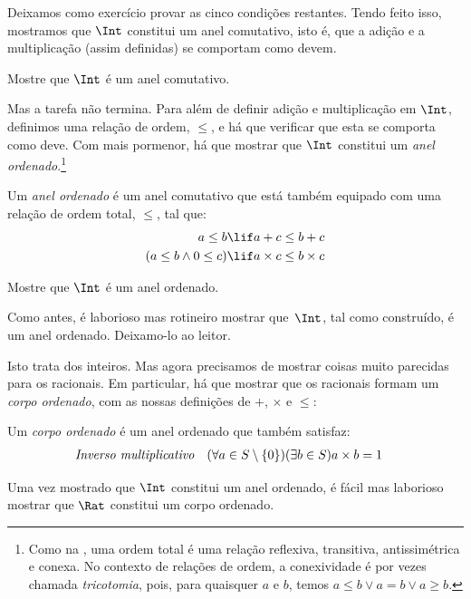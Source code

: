 \documentclass[../../../include/open-logic-section]{subfiles}
\begin{document}
Deixamos como exercício provar as cinco condições restantes. Tendo feito isso,
mostramos que $\Int$ constitui um anel comutativo, isto é, que a adição e a
multiplicação (assim definidas) se comportam como devem.

\begin{prob}
Mostre que $\Int$ é um anel comutativo.
\end{prob}

Mas a tarefa não termina. Para além de definir adição e multiplicação em $\Int$,
definimos uma relação de ordem, $\leq$, e há que verificar que esta se comporta
como deve. Com mais pormenor, há que mostrar que $\Int$ constitui um \emph{anel
ordenado}.\footnote{Como na , uma
	ordem total é uma relação reflexiva, transitiva, antissimétrica e conexa.
	No contexto de relações de ordem, a conexividade é por vezes chamada
	\emph{tricotomia}, pois, para quaisquer $a$ e $b$, temos $a \leq b \lor a
	= b \lor a \geq b$.} 

\begin{defn}
Um \emph{anel ordenado} é um anel comutativo que está também equipado com uma
relação de ordem total, $\leq$, tal que:
\begin{align*}
	a \leq b &\lif a + c \leq b + c\\
	(a \leq b \land 0 \leq c) &\lif a \times c \leq b \times c
\end{align*}
\end{defn}

\begin{prob}
Mostre que $\Int$ é um anel ordenado. 
\end{prob}

Como antes, é laborioso mas rotineiro mostrar que~$\Int$, tal como construído, é
um anel ordenado. Deixamo-lo ao leitor.

Isto trata dos inteiros. Mas agora precisamos de mostrar coisas muito parecidas
para os racionais. Em particular, há que mostrar que os racionais formam um
\emph{corpo ordenado}, com as nossas definições de $+$, $\times$ e $\leq$:
\begin{defn}
Um \emph{corpo ordenado} é um anel ordenado que também satisfaz:
\begin{align*}
	\emph{Inverso multiplicativo}& & (\forall a \in S \setminus \{0\})(\exists b \in S) a\times b& = 1
\end{align*}
\end{defn}

Uma vez mostrado que $\Int$ constitui um anel ordenado, é fácil mas laborioso
mostrar que $\Rat$ constitui um corpo ordenado.
\end{document}
